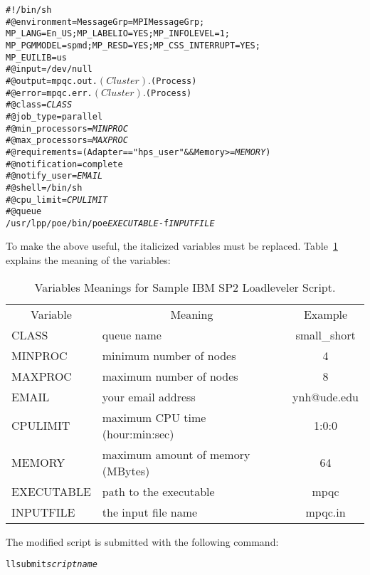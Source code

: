 \begin{alltt}
#!/bin/sh
#@ environment = MessageGrp=MPIMessageGrp;\\
   MP_LANG=En_US;MP_LABELIO=YES;MP_INFOLEVEL=1;\\
   MP_PGMMODEL=spmd;MP_RESD=YES;MP_CSS_INTERRUPT=YES;\\
   MP_EUILIB=us
#@ input = /dev/null
#@ output = mpqc.out.$(Cluster).$(Process)
#@ error = mpqc.err.$(Cluster).$(Process)
#@ class = {\itshape CLASS}
#@ job_type = parallel
#@ min_processors = {\itshape MINPROC}
#@ max_processors = {\itshape MAXPROC}
#@ requirements =  (Adapter == "hps_user" && Memory >= {\itshape MEMORY})
#@ notification = complete
#@ notify_user = {\itshape EMAIL}
#@ shell = /bin/sh
#@ cpu_limit = {\itshape CPULIMIT}
#@ queue
/usr/lpp/poe/bin/poe {\itshape EXECUTABLE} -f {\itshape INPUTFILE}
\end{alltt}

To make the above useful, the italicized variables must be replaced.
Table~\ref{runningspvariables} explains the meaning of the variables:

\begin{table}
\caption{Variables Meanings for Sample IBM SP2 Loadleveler Script.}
\begin{center}
\begin{tabular}{lp{2.5in}c}
  \multicolumn{1}{c}{Variable}
     & \multicolumn{1}{c}{Meaning}
     & \multicolumn{1}{c}{Example} \\
  CLASS & queue name & small\_short \\
  MINPROC & minimum number of nodes & 4 \\
  MAXPROC & maximum number of nodes & 8 \\
  EMAIL & your email address & ynh@ude.edu \\
  CPULIMIT & maximum CPU time (hour:min:sec) & 1:0:0 \\
  MEMORY & maximum amount of memory (MBytes) & 64 \\
  EXECUTABLE & path to the executable & mpqc \\
  INPUTFILE & the input file name & mpqc.in \\
\end{tabular}
\end{center}
\label{runningspvariables}
\end{table}

The modified script is submitted with the following command:

\begin{alltt}
llsubmit {\itshape scriptname}
\end{alltt}

